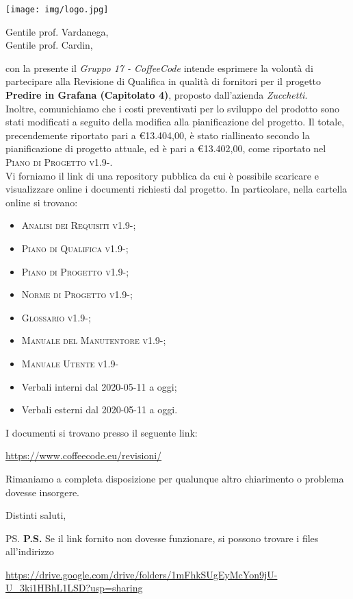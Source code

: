 \documentclass{letter}
\date{11 Giugno 2020}
\begin{document}
\begin{letter}{ }

\texttt{[image: img/logo.jpg]}

\opening{Gentile prof. Vardanega, \\
Gentile prof. Cardin,}

con la presente il \textit{Gruppo 17 - CoffeeCode} intende esprimere la volontà di partecipare alla Revisione di Qualifica in qualità di fornitori per il progetto 
\textbf{Predire in Grafana (Capitolato 4)}, proposto dall'azienda \textit{Zucchetti}. \\
Inoltre, comunichiamo che i costi preventivati per lo sviluppo del prodotto sono stati modificati a seguito della modifica alla pianificazione del progetto.
Il totale, precendemente riportato pari a \euro 13.404,00, è stato riallineato secondo la pianificazione di progetto attuale, ed è pari a \euro 13.402,00, come riportato nel \textsc{Piano di Progetto v1.9-}. \\
Vi forniamo il link di una repository pubblica da cui è possibile scaricare e visualizzare online i documenti richiesti dal progetto. In particolare, nella cartella online si trovano:
\begin{itemize}
  \item \textsc{Analisi dei Requisiti v1.9-};
  \item \textsc{Piano di Qualifica v1.9-};
  \item \textsc{Piano di Progetto v1.9-};
  \item \textsc{Norme di Progetto v1.9-};
  \item \textsc{Glossario v1.9-};
  \item \textsc{Manuale del Manutentore v1.9-};
  \item \textsc{Manuale Utente v1.9-}
  \item Verbali interni dal 2020-05-11 a oggi;
  \item Verbali esterni dal 2020-05-11 a oggi.
\end{itemize}
\newpage
I documenti si trovano presso il seguente link:
\begin{center}
  \centering
  \href{https://www.coffeecode.eu/revisioni/}{https://www.coffeecode.eu/revisioni/}
\end{center}


Rimaniamo a completa disposizione per qualunque altro chiarimento o problema dovesse insorgere.

\closing{Distinti saluti,}

\ps
\textbf{P.S.} Se il link fornito non dovesse funzionare, si possono trovare i files all'indirizzo
\begin{center}
	
	\href{https://drive.google.com/drive/folders/1mFhkSUgEyMcYon9jU-U_3ki1HBhL1LSD?usp=sharing}{https://drive.google.com/drive/folders/1mFhkSUgEyMcYon9jU-U\_3ki1HBhL1LSD?usp=sharing}
\end{center}

\end{letter}
\end{document}
